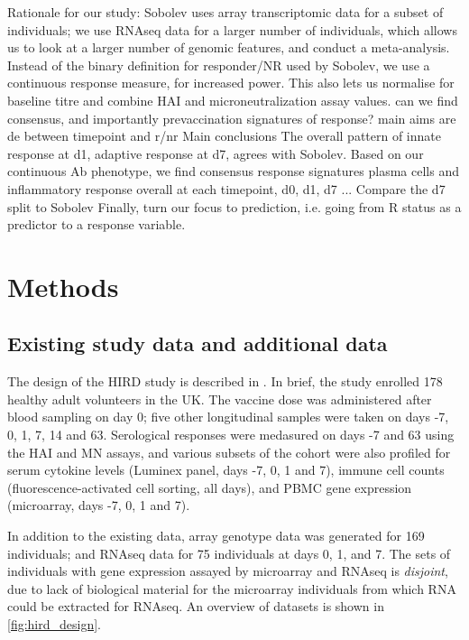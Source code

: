 \begin{outline}

    \1 Rationale for our study:
        \2 Sobolev uses array transcriptomic data for a subset of individuals; we use RNAseq data for a larger number of individuals, which allows us to look at a larger number of genomic features, and conduct a meta-analysis.
        \2 Instead of the binary definition for responder/NR used by Sobolev, we use a continuous response measure, for increased power. This also lets us normalise for baseline titre and combine HAI and microneutralization assay values.
            \3 can we find consensus, and importantly prevaccination signatures of response?
        \2 main aims are de between timepoint and r/nr
    \1 Main conclusions
        \2 The overall pattern of innate response at d1, adaptive response at d7, agrees with Sobolev.
        \2 Based on our continuous Ab phenotype, we find consensus response signatures
            \3 plasma cells and inflammatory response overall
            \3 at each timepoint, d0, d1, d7 ... 
                \4 Compare the d7 split to Sobolev 
    \1 Finally, turn our focus to prediction, i.e. going from R status as a predictor to a response variable.

\end{outline}

\section{Methods}

\subsection{Existing  study data and additional data}

The design of the \gls{HIRD} study is described in \autocite{sobolev2016AdjuvantedInfluenzaH1N1Vaccination}.
In brief, the study enrolled 178 healthy adult volunteers in the UK.
The vaccine dose was administered after blood sampling on day 0; five other longitudinal samples were taken on days -7, 0, 1, 7, 14 and 63.
Serological responses were medasured on days -7 and 63 using the \gls{HAI} and \gls{MN} assays, and various subsets of the cohort were also profiled for serum cytokine levels (Luminex panel, days -7, 0, 1 and 7), immune cell counts (fluorescence-activated cell sorting, all days), and \gls{PBMC} gene expression (microarray, days -7, 0, 1 and 7).

In addition to the existing data, array genotype data was generated for 169 individuals; and \gls{RNAseq} data for 75 individuals at days 0, 1, and 7.
The sets of individuals with gene expression assayed by microarray and \gls{RNAseq} is \emph{disjoint}, due to lack of biological material for the microarray individuals from which RNA could be extracted for \gls{RNAseq}.
An overview of datasets is shown in \autoref{fig:hird_design}.

